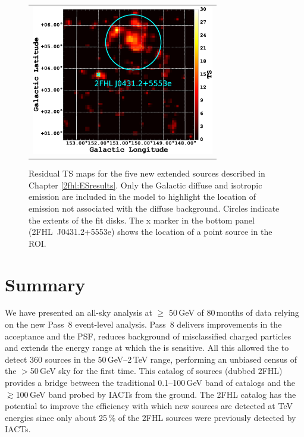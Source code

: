 \begin{figure}[ht]
\begin{center}
\begin{tabular}{ll}
			\multicolumn{2}{c}{\includegraphics[width=8cm]{Figures/l145_b0_ES_1_residTSmap_2FHL_zoom.eps} }\\
		\end{tabular}
	\end{center}
	\caption{
		\label{fig:6ES} Residual TS maps for the five new extended sources described in Chapter \ref{2fhl:ESresults}.  Only the Galactic diffuse and isotropic emission are included in the model to highlight the location of emission not associated with the diffuse background. Circles indicate the extents of the fit disks. {The x marker in the bottom panel (2FHL~J0431.2+5553e) shows the location of a point source in the ROI.}}
\end{figure}






%
%
\section{Summary}
\label{sec:summary}

We have presented an all-sky analysis at $\geq$ 50\,GeV
of 80\,months of \lat{} data relying on the new Pass~8 event-level analysis.
Pass~8 delivers improvements in the acceptance and the PSF, reduces
background of misclassified charged particles
and extends the energy range at which the \lat{} is sensitive.
All this allowed the \lat{} to detect 360 sources in the 50\,GeV--2\,TeV range,
performing an unbiased census of the $>$50\,GeV sky for the first time.
This catalog of sources (dubbed 2FHL) provides a bridge between
the traditional 0.1--100\,GeV band of \lat{} catalogs \citep{3FGL}
and the $\gtrsim$100\,GeV band probed by IACTs from the ground.
The 2FHL catalog has the potential to improve the efficiency with
which new sources are detected at TeV energies since only
about 25\,\% of the 2FHL sources were previously detected by IACTs.

